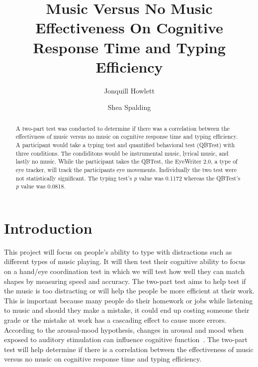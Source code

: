 \documentclass[manuscript, screen, review]{acmart} %
\begin{document}
\title{Music Versus No Music Effectiveness On Cognitive Response Time and Typing Efficiency}

\author{Jonquill Howlett}

\author{Shea Spalding}

\renewcommand{\shortauthors}{Howlett, Spalding}

\begin{abstract}
A two-part test was conducted to determine if there was a correlation between the effectivness of music versus no music on cognitive response time
and typing efficiency. A participant would take a typing test and quantified behavioral test (QBTest) with three conditions.
The condiditons would be instrumental music, lyrical music, and lastly no music. While the participant takes the QBTest, the EyeWriter 2.0,
a type of eye tracker, will track the participants eye movements.
Individually the two test were not statistically significant. The typing test's \textit{p} value was 0.1172 whereas the QBTest's \textit{p} value was 0.0818. 
\end{abstract}

\maketitle

\section{Introduction}
This project will focus on people's ability to type with distractions such as different types of music playing. 
It will then test their cognitive ability to focus on a hand/eye coordination test in which we will test how well they can match shapes by measuring speed and accuracy. 
The two-part test aims to help test if the music is too distracting or will help the people be more efficient at their work. 
This is important because many people do their homework or jobs while listening to music and should they make a mistake, it could end up costing someone their grade or the mistake at work has a cascading effect to cause more errors. 
According to the arousal-mood hypothesis, changes in arousal and mood when exposed to auditory stimulation can influence cognitive function~\cite{Chee}.
The two-part test will help determine if there is a correlation between the effectiveness of music versus no music on cognitive response time and typing efficiency. 
\end{document}
